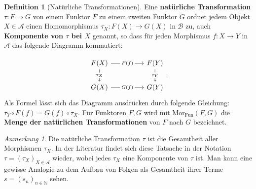 \documentclass[leqno]{article}
\theoremstyle{plain}
\theoremstyle{definition}
\newtheorem{defn}{Definition}[section]
\theoremstyle{remark}
\newtheorem*{rem}{Anmerkung}
\begin{document}
\begin{defn}[Natürliche Transformationen]
Eine \textbf{natürliche Transformation} $\tau: F \Longrightarrow G$ von einem Funktor $F$ zu einem zweiten Funktor $G$ ordnet jedem Objekt $X \in \mathcal{A}$ einen Homomorphismus $\tau_{X}: F(X) \rightarrow G(X)$ in $\mathcal{B}$ zu, auch \textbf{Komponente von $\tau$ bei $X$} genannt, so dass für jeden Morphismus $f: X \rightarrow Y$ in $\mathcal{A}$ das folgende Diagramm kommutiert:
\end{defn}
\begin{equation}
	\begin{tikzcd}
	F(X) \arrow[rr, "F(f)" description] \arrow[d, "\tau_{X}" description] &  & F(Y) \arrow[d, "\tau_{Y}" description] \\
	G(X) \arrow[rr, "G(f)" description]                                   &  & G(Y)                                  
	\end{tikzcd}.
\end{equation}
Als Formel lässt sich das Diagramm ausdrücken durch folgende Gleichung: $\tau_{Y} \circ F(f) = G(f) \circ \tau_{X}$. Für Funktoren $F,G$ wird mit $\text{Mor}_{\text{Fun}}(F,G)$ die \textbf{Menge der natürlichen Transformationen} von $F$ nach $G$ bezeichnet.

\begin{rem}
Die natürliche Transformation $\tau$ ist die Gesamtheit aller Morphismen $\tau_{X}$. In der Literatur findet sich diese Tatsache in der Notation $\tau = (\tau_{X})_{X \in \mathcal{A}}$ wieder, wobei jedes $\tau_{X}$ eine Komponente von $\tau$ ist. Man kann eine gewisse Analogie zu dem Aufbau von Folgen als Gesamtheit ihrer Terme $s = (s_n)_{n \in \mathbb{N}}$ sehen.
\end{rem}
\end{document}
